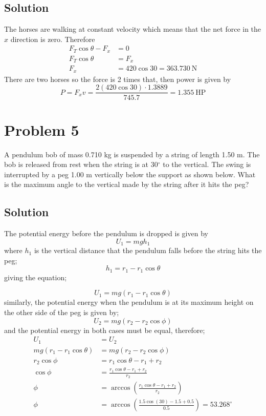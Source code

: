 \documentclass{article}
\begin{document}
\subsection*{Solution}
The horses are walking at constant velocity which means that the net force in the $x$ direction is zero. Therefore
\begin{align*}
	F_T \cos \theta - F_x &= 0 \\
	F_T \cos \theta &= F_x \\
	F_x &= 420 \cos 30 = 363.730\ \text{N}
\end{align*}
There are two horses so the force is 2 times that, then power is given by
\[
	P = F_x v = \frac{2 \left(420 \cos 30 \right) \cdot 1.3889}{745.7} = \boxed{1.355\ \text{HP}}
\]

\section*{Problem 5}
A pendulum bob of mass 0.710 kg is suspended by a string of length 1.50 m. The bob is released from rest
when the string is at 30$^\circ$ to the vertical. The swing is interrupted by a peg 1.00 m vertically below the support
as shown below. What is the maximum angle to the vertical made by the string after it hits the peg?

\subsection*{Solution}
The potential energy before the pendulum is dropped is given by
\[
	U_1 = mgh_1
\]
where $h_1$ is the vertical distance that the pendulum falls before the string hits the peg;
\[
	h_1 = r_1 - r_1\cos\theta
\]
giving the equation;

\[
	U_1 = mg\left(r_1 - r_1\cos\theta\right)
\]
similarly, the potential energy when the pendulum is at its maximum height on the other side of the peg is given by;
\[
	U_2 = mg \left(r_2 - r_2 \cos\phi \right)
\]
and the potential energy in both cases must be equal, therefore;
\begin{align*}
	U_1 &= U_2 \\
	mg\left(r_1 - r_1\cos\theta\right) &= mg \left(r_2 - r_2 \cos\phi \right) \\
	r_2 \cos \phi &= r_1\cos\theta - r_1 + r_2 \\
	\cos\phi &= \frac{r_1\cos\theta - r_1 + r_2}{r_2} \\
	\phi &= \arccos \left( \frac{r_1\cos\theta - r_1 + r_2}{r_2} \right) \\
	\phi &= \arccos \left( \frac{1.5\cos(30) - 1.5 + 0.5}{0.5} \right) = \boxed{53.268^\circ}
\end{align*}
\end{document}

